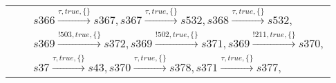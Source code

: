 \begin{tabular}{lcp{350px}}
& & $\mathit{s366}\xrightarrow{\mathit{\tau}, \mathit{true}, \{\}}\mathit{s367},\mathit{s367}\xrightarrow{\mathit{\tau}, \mathit{true}, \{\}}\mathit{s532},\mathit{s368}\xrightarrow{\mathit{\tau}, \mathit{true}, \{\}}\mathit{s532},$ \\
& & $\mathit{s369}\xrightarrow{\mathit{!503}, \mathit{true}, \{\}}\mathit{s372},\mathit{s369}\xrightarrow{\mathit{!502}, \mathit{true}, \{\}}\mathit{s371},\mathit{s369}\xrightarrow{\mathit{!211}, \mathit{true}, \{\}}\mathit{s370},$ \\
& & $\mathit{s37}\xrightarrow{\mathit{\tau}, \mathit{true}, \{\}}\mathit{s43},\mathit{s370}\xrightarrow{\mathit{\tau}, \mathit{true}, \{\}}\mathit{s378},\mathit{s371}\xrightarrow{\mathit{\tau}, \mathit{true}, \{\}}\mathit{s377},$ \\
\end{tabular}

